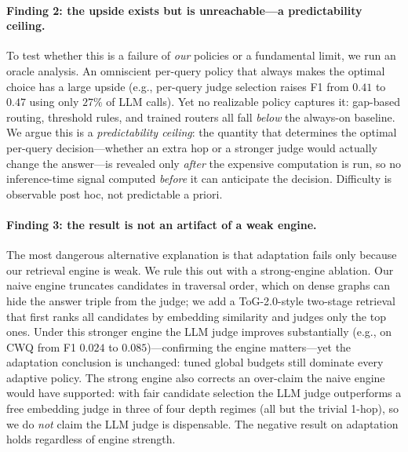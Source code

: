 \paragraph{Finding 2: the upside exists but is unreachable---a predictability ceiling.}
To test whether this is a failure of \emph{our} policies or a fundamental limit, we run an oracle analysis. An omniscient per-query policy that always makes the optimal choice has a large upside (e.g., per-query judge selection raises F1 from $0.41$ to $0.47$ using only $27\%$ of LLM calls). Yet no realizable policy captures it: gap-based routing, threshold rules, and trained routers all fall \emph{below} the always-on baseline. We argue this is a \emph{predictability ceiling}: the quantity that determines the optimal per-query decision---whether an extra hop or a stronger judge would actually change the answer---is revealed only \emph{after} the expensive computation is run, so no inference-time signal computed \emph{before} it can anticipate the decision. Difficulty is observable post hoc, not predictable a priori.

\paragraph{Finding 3: the result is not an artifact of a weak engine.}
The most dangerous alternative explanation is that adaptation fails only because our retrieval engine is weak. We rule this out with a strong-engine ablation. Our naive engine truncates candidates in traversal order, which on dense graphs can hide the answer triple from the judge; we add a ToG-2.0-style two-stage retrieval that first ranks all candidates by embedding similarity and judges only the top ones. Under this stronger engine the LLM judge improves substantially (e.g., on CWQ from F1 $0.024$ to $0.085$)---confirming the engine matters---yet the adaptation conclusion is unchanged: tuned global budgets still dominate every adaptive policy. The strong engine also corrects an over-claim the naive engine would have supported: with fair candidate selection the LLM judge outperforms a free embedding judge in three of four depth regimes (all but the trivial 1-hop), so we do \emph{not} claim the LLM judge is dispensable. The negative result on adaptation holds regardless of engine strength.

